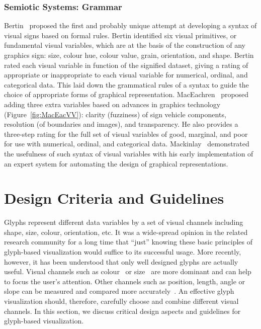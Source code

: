 \subsubsection{Semiotic Systems: Grammar}
Bertin~\cite{bertin83semiologyOfGraphics}  proposed the first and probably unique attempt at developing a syntax of visual signs based on formal rules. Bertin identified six visual primitives, or fundamental visual variables, which are at the basis of the construction of any graphics sign: size, colour hue, colour value, grain, orientation, and shape. Bertin rated each visual variable in function of the signified dataset, giving a rating of appropriate or inappropriate to each visual variable for numerical, ordinal, and categorical data. This laid down the grammatical rules of a syntax to guide the choice of appropriate forms of graphical representation. 
MacEachren~\cite{MacEachren:2004} proposed adding three extra variables based on advances in graphics technology (Figure~\ref{fig:MacEacVV}):
clarity (fuzziness) of sign vehicle components, resolution
(of boundaries and images), and transparency. He also provides a three-step rating for the full set of visual variables of good, marginal, and poor for use with numerical, ordinal, and categorical data.
Mackinlay~\cite{Mackinlay:1986:TOG} demonstrated the usefulness of such syntax of visual variables with his early implementation of an expert system for automating the design of graphical representations.


\section{Design Criteria and Guidelines}\label{sec:DesignCriteria}
Glyphs represent different data variables by a set of visual channels including shape, size, colour, orientation, etc.
It was a wide-spread opinion in the related research community for a long time that ``just'' knowing these basic principles of glyph-based visualization would suffice to its successful usage.
More recently, however, it has been understood that only well designed glyphs are actually useful.
Visual channels such as colour~\cite{Christ75color} or size~\cite{Li10symbolSize} are more dominant and can help to focus the user's attention.
Other channels such as position, length, angle or slope can be measured and compared more accurately~\cite{ClevelandMcGill84Perception, Healey96preattentive}.
An effective glyph visualization should, therefore, carefully choose and combine different visual channels.
In this section, we discuss critical design aspects and guidelines for glyph-based visualization.


